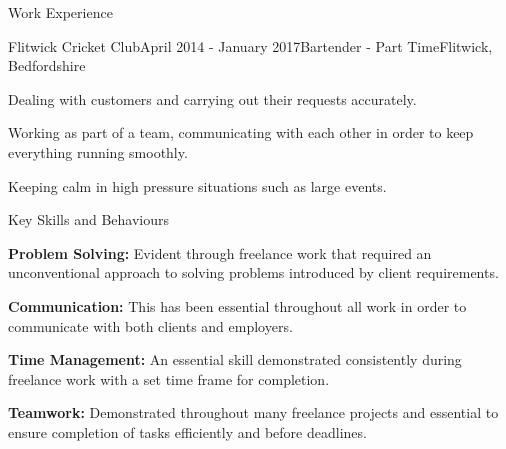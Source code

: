 \documentclass{resume} %
\begin{document}
\begin{rSection}{Work Experience}

\begin{rSubsection}{Flitwick Cricket Club}{April 2014 - January 2017}{Bartender - Part Time}{Flitwick, Bedfordshire}
\item Dealing with customers and carrying out their requests accurately.
\item Working as part of a team, communicating with each other in order to keep everything running smoothly.
\item Keeping calm in high pressure situations such as large events.
\end{rSubsection}

\end{rSection}


\begin{rSectionList}{Key Skills and Behaviours}
\item \textbf{Problem Solving:}
Evident through freelance work that required an unconventional approach to solving problems introduced by client requirements.

\item \textbf{Communication:} 
This has been essential throughout all work in order to communicate with both clients and employers. 

\item \textbf{Time Management:}
An essential skill demonstrated consistently during freelance work with a set time frame for completion.

\item \textbf{Teamwork:}
Demonstrated throughout many freelance projects and essential to ensure completion of tasks efficiently and before deadlines.
\end{rSectionList}

\end{document}
